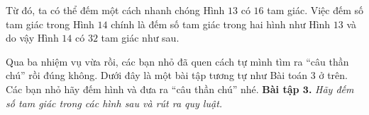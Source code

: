 	\begin{multicols}{2}
		Từ đó, ta có thể đếm một cách nhanh chóng Hình $13$ có $16$ tam giác. Việc đếm số tam giác trong Hình $14$ chính là đếm số tam giác trong hai hình như Hình $13$ và do vậy Hình $14$ có $32$ tam giác như sau.
		\begin{figure}[H]
			\centering
			\captionsetup{labelformat= empty, justification=centering}
			\captionsetup[subfigure]{labelformat=empty}
			\hfill{}
			\hfill
			\hfill
		\end{figure} 
	\end{multicols}
	Qua ba nhiệm vụ vừa rồi, các bạn nhỏ đã quen cách tự mình tìm ra “câu thần chú” rồi đúng không. Dưới đây là một bài tập tương tự như Bài toán $3$ ở trên. Các bạn nhỏ hãy đếm hình và đưa ra “câu thần chú” nhé.
	\vskip 0.1cm
	\textbf{\color{toancuabi}Bài tập $\pmb{3}$.} \textit{Hãy đếm số tam giác trong các hình sau và rút ra quy luật.}
	\begin{figure}[H]
		\centering
		\vspace*{-5pt}
		\captionsetup{labelformat= empty, justification=centering}
		\captionsetup[subfigure]{labelformat=empty}
		\hfill{}\hfill
		\hfill
		\vspace*{-5pt}
	\end{figure} 
